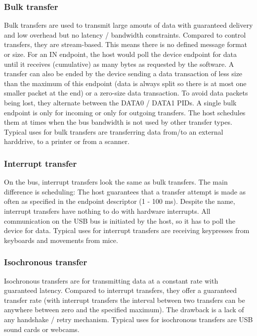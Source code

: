 \documentclass{article}
\begin{document}
\subsubsection {Bulk transfer}

Bulk transfers are used to transmit large amouts of data with guaranteed delivery
and low overhead but no latency / bandwidth constraints.
Compared to control transfers, they are stream-based. This means there is no defined message
format or size. For an IN endpoint, the host would poll the device endpoint for data until it receives
(cumulative) as many bytes as requested by the software. A transfer can also be ended by the device sending
a data transaction of less size than the maximum of this endpoint (data is always split so there is at most one
smaller packet at the end) or a zero-size data transaction. To avoid data packets being lost, they
alternate between the DATA0 / DATA1 PIDs. A single bulk endpoint is only for incoming
or only for outgoing transfers.
The host schedules them at times when the bus bandwidth is not used by other transfer types.
Typical uses for bulk transfers are transferring data from/to an external harddrive,
to a printer or from a scanner.

\subsubsection {Interrupt transfer}

On the bus, interrupt transfers look the same as bulk transfers.
The main difference is scheduling: The host guarantees that a transfer
attempt is made as often as specified in the endpoint descriptor (1 - 100 ms).
Despite the name, interrupt transfers have nothing to do with hardware interrupts.
All communication on the USB bus is initiated by the host, so it has to poll the device
for data.
Typical uses for interrupt transfers are receiving keypresses from keyboards and
movements from mice.

\subsubsection {Isochronous transfer}

Isochronous transfers are for transmitting data at a constant rate with guaranteed
latency. Compared to interrupt transfers, they offer a guaranteed transfer rate
(with interrupt transfers the interval between two transfers can be anywhere
between zero and the specified maximum). The drawback is a lack of any handshake
/ retry mechanism.
Typical uses for isochronous transfers are USB sound cards or webcams.
\end{document}
